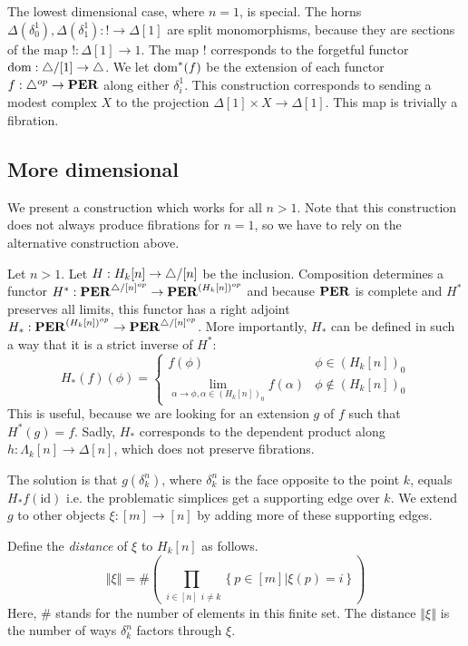 \documentclass{amsart}
\theoremstyle{plain}
\theoremstyle{definition}
\newcommand\set[1]{\left\{#1\right\}}
\newcommand\id{\mathrm{id}}
\newcommand\ri{^*}
\begin{document}
The lowest dimensional case, where $n=1$, is special. The horns $\Delta(\delta^1_0),\Delta(\delta^1_1):!\to \Delta[1]$ are split monomorphisms, because they are sections of the map $!:\Delta[1]\to 1$. The map $!$ corresponds to the forgetful functor $\mathrm{dom}:{\mathord{\triangle}}/[1]\to{\mathord{\triangle}}$. We let $\mathrm{dom}^*(f)$ be the extension of each functor $f:{\mathord{\triangle}}^{op} \to \mathbf{PER}$ along either $\delta^1_i$. This construction corresponds to sending a modest complex $X$ to the projection $\Delta[1]\times X \to \Delta[1]$. This map is trivially a fibration.

\subsection{More dimensional}%
We present a construction which works for all $n>1$. Note that this construction does not always produce fibrations for $n=1$, so we have to rely on the alternative construction above.

Let $n>1$. Let $H:H_k[n] \to {\mathord{\triangle}}/[n]$ be the inclusion. Composition determines a functor $H\ri:\pers^{\simcat/[n]\dual} \to \pers^{(H_k[n])\dual}$ and because $\mathbf{PER}$ is complete and $H\ri$ preserves all limits, this functor has a right adjoint $H_*:\mathbf{PER}^{(H_k[n])^{op}}\to\mathbf{PER}^{{\mathord{\triangle}}/[n]^{op}}$. More importantly, $H_*$ can be defined in such a way that it is a strict inverse of $H\ri$:
\[ H_*(f)(\phi) = \left\{\begin{array}{cc} 
f(\phi) & \phi\in (H_k[n])_0\\
\lim\limits_{\alpha\to \phi, \alpha\in (H_k[n])_0} f(\alpha) & \phi\not\in (H_k[n])_0
\end{array}\right.\]
This is useful, because we are looking for an extension $g$ of $f$ such that $H\ri(g) = f$. Sadly, $H_*$ corresponds to the dependent product along $h:\Lambda_k[n] \to \Delta[n]$, which does not preserve fibrations.

\newcommand\norm[1]{\left\Vert#1\right\Vert}
The solution is that $g(\delta^n_{k})$, where $\delta^n_k$ is the face opposite to the point $k$, equals $H_*f(\id)$ i.e. the problematic simplices get a supporting edge over $k$. We extend $g$ to other objects $\xi:[m]\to[n]$ by adding more of these supporting edges.

Define the \emph{distance} of $\xi$ to $H_k[n]$ as follows.
\[ \norm\xi = \#\left( \prod_{\substack{i\in [n]}{i\neq k}}\set{p\in [m]|\xi(p)=i}\right)\]
Here, $\#$ stands for the number of elements in this finite set. The distance $\norm\xi$ is the number of ways $\delta^n_k$ factors through $
\xi$.
\end{document}
